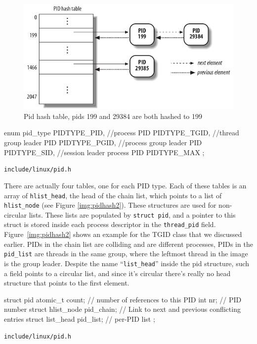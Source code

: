 \documentclass[10pt]{book}
\begin{document}
\begin{figure}[ht]
\includegraphics[width=\textwidth]{images/pidhash1.png}
\caption{Pid hash table, pids 199 and 29384 are both hashed to 199}
\label{img:pidhash1}
\end{figure}

\begin{code}
enum pid_type {
	PIDTYPE_PID,  //process PID
	PIDTYPE_TGID, //thread group leader PID
	PIDTYPE_PGID, //process group leader PID
	PIDTYPE_SID,  //session leader process PID
	PIDTYPE_MAX
};
\end{code}
\verb|include/linux/pid.h|

There are actually four tables, one for each PID type. Each of these tables is an array of \verb|hlist_head|, the head of the chain list, which points to a list of \verb|hlist_node| (see Figure \ref{img:pidhash2}). These  structures are used for non-circular lists. These lists are populated by \verb|struct pid|, and a pointer to this struct is stored inside each process descriptor in the \verb|thread_pid| field. Figure~\ref{img:pidhash2} shows an example for the TGID class that we discussed earlier. PIDs in the chain list are colliding and are different processes, PIDs in the \verb|pid_list| are threads in the same group, where the leftmost thread in the image is the group leader. Despite the name ``\verb|list_head|'' inside the pid structure, such a field points to a circular list, and since it's circular there's really no head structure that points to the first element. %

\begin{code}
struct pid {
        atomic_t count; // number of references to this PID
	int nr; // PID number
	struct hlist_node pid_chain; // Link to next and previous conflicting entries
	struct list_head pid_list;  // per-PID list
};
\end{code}
\verb|include/linux/pid.h|
\end{document}
